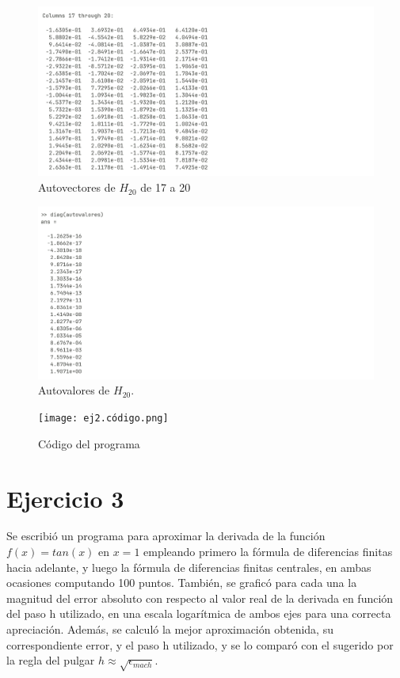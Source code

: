 \documentclass{article}
\begin{document}
\begin{figure}[H]
    \centering
    \includegraphics[width=1\linewidth]{ej2.resultado.3.png}
    \caption{Autovectores de $H_{20}$ de 17 a 20}
    \label{fig:enter-label}
\end{figure}

\begin{figure}[H]
    \centering
    \includegraphics[width=1\linewidth]{ej2.resultado.4.png}
    \caption{Autovalores de $H_{20}$.}
    \label{fig:enter-label}
\end{figure}

\begin{figure}[H]
    \centering
    \texttt{[image: ej2.código.png]}
    \caption{Código del programa}
    \label{fig:enter-label}
\end{figure}

\section{Ejercicio 3}
Se escribió un programa para aproximar la derivada de la función $f(x)=tan(x)$ en $x=1$ empleando primero la fórmula de diferencias finitas hacia adelante, y luego la fórmula de diferencias finitas centrales, en ambas ocasiones computando 100 puntos. También, se graficó para cada una la magnitud del error absoluto con respecto al valor real de la derivada en función del paso h utilizado, en una escala logarítmica de ambos ejes para una correcta apreciación. Además, se calculó la mejor aproximación obtenida, su correspondiente error, y el paso h utilizado, y se lo comparó con el sugerido por la regla del pulgar $h\approx \sqrt{\epsilon_{mach}}$.\\
\end{document}
